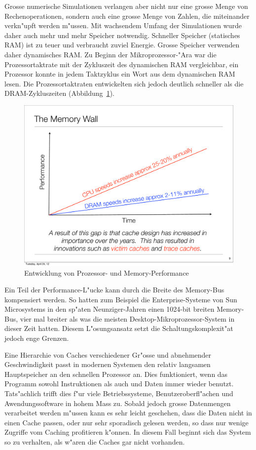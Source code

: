 Grosse numerische Simulationen verlangen aber nicht nur eine grosse
Menge von Rechenoperationen, sondern auch eine grosse Menge von
Zahlen, die miteinander verkn"upft werden m"ussen.
Mit wachsendem Umfang der Simulationen wurde daher auch mehr
und mehr Speicher notwendig. Schneller Speicher (statisches RAM) ist
zu teuer und verbraucht zuviel Energie. Grosse Speicher verwenden
daher dynamisches RAM. Zu Beginn der Mikroprozessor-"Ara war
die Prozessortaktrate mit der Zykluszeit des dynamischen RAM
vergleichbar, ein Prozessor konnte in jedem Taktzyklus 
ein Wort aus dem dynamischen RAM lesen. Die Prozessortaktraten
entwickelten sich jedoch deutlich schneller als die DRAM-Zykluszeiten
(Abbildung~\ref{memorywall}).
\begin{figure}
\begin{center}
\includegraphics[width=0.6\hsize]{images/memorywall.pdf}
\end{center}
\caption{Entwicklung von Prozessor- und Memory-Performance
\label{memorywall}}
\end{figure}

Ein Teil der Performance-L"ucke kann durch
die Breite des Memory-Bus kompensiert werden. So hatten zum Beispiel die
Enterprise-Systeme von Sun Microsystems in den sp"aten Neunziger-Jahren
einen 1024-bit breiten Memory-Bus, vier mal breiter als was die meisten
Desktop-Mikroprozessor-System in dieser Zeit hatten.
Diesem L"osungsansatz setzt die Schaltungskomplexit"at jedoch enge Grenzen.

Eine Hierarchie von Caches verschiedener Gr"osse und abnehmender
Geschwindigkeit passt in modernen Systemen den relativ langsamen
Hauptspeicher an den schnellen Prozessor an. Dies funktioniert,
wenn  das Programm sowohl Instruktionen als auch und Daten immer wieder benutzt.
Tats"achlich trifft dies f"ur viele Betriebssysteme, Benutzeroberfl"achen
und Awendungssoftware in hohem Mass zu.
Sobald jedoch grosse Datenmengen verarbeitet werden m"ussen kann
es sehr leicht geschehen, dass die Daten nicht in einen Cache passen,
oder nur sehr sporadisch gelesen werden, so dass nur wenige Zugriffe
vom Caching profitieren k"onnen.
In diesem Fall beginnt sich das System so zu verhalten, als w"aren die
Caches gar nicht vorhanden.


